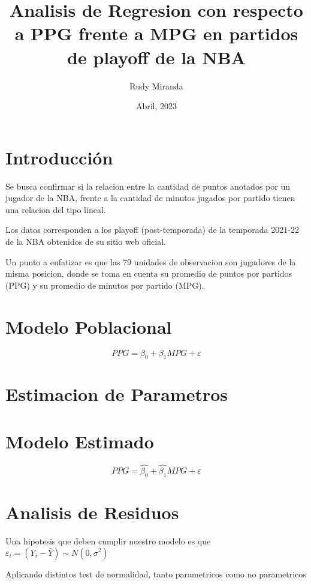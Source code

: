 \documentclass{IEEEtran}
\title{Analisis de Regresion con respecto a PPG frente a MPG en partidos de playoff de la NBA}
\author{Rudy Miranda}
\date{Abril, 2023}
\begin{document}
    \maketitle

    \section{Introducci\'on}
    Se busca confirmar si la relacion entre la cantidad de puntos anotados por un jugador de la NBA, frente a la cantidad de minutos jugados por partido tienen una relacion del tipo lineal.

    Los datos corresponden a los playoff (post-temporada) de la temporada 2021-22 de la NBA obtenidos de su sitio web oficial.

    Un punto a enfatizar es que las 79 unidades de  observacion son jugadores de la misma posicion, donde se toma en cuenta su promedio de puntos por partidos (PPG) y su promedio de minutos por partido (MPG).
    
    \section{Modelo Poblacional}
    
    \begin{equation}
        PPG = \beta_0 + \beta_1 MPG + \varepsilon        
    \end{equation}
    
    \section{Estimacion de Parametros}
    \section{Modelo Estimado}
    
    \begin{equation}
        PPG = \hat{\beta_0} + \hat{\beta_1} MPG + \varepsilon        
    \end{equation}
    
    \section{Analisis de Residuos}
    Una hipotesis que deben cumplir nuestro modelo es que $\varepsilon_i = (Y_i - \bar{Y}) \sim N(0, \sigma^2)$

    Aplicando distintos test de normalidad, tanto parametricos como no parametricos
    
\end{document}
